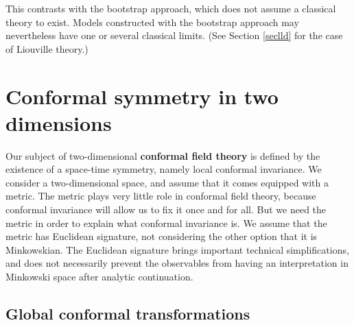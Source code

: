 \documentclass[12pt, a4paper, notitlepage, twoside]{report}
\numberwithin{equation}{section}
\theoremstyle{break}
\begin{document}
This contrasts with the bootstrap approach, which does not assume a classical theory to exist.
Models constructed with the bootstrap approach may nevertheless have one or several classical limits. (See Section \ref{seclld} for the case of Liouville theory.)

\section{Conformal symmetry in two dimensions \label{secconf}}

Our subject of two-dimensional \textbf{conformal field theory} is defined by the existence of a space-time symmetry, namely local conformal invariance. 
We consider a two-dimensional space, and assume that it comes equipped with a metric.
The metric plays very little role in conformal field theory, because conformal invariance will allow us to fix it once and for all.
But we need the metric in order to explain what conformal invariance is.
We assume that the metric has Euclidean signature, not considering the other option that it is Minkowskian.
The Euclidean signature brings important technical simplifications, and does not necessarily prevent the observables from having an interpretation in Minkowski space after analytic continuation.

\subsection{Global conformal transformations\label{secglob}}
\end{document}
